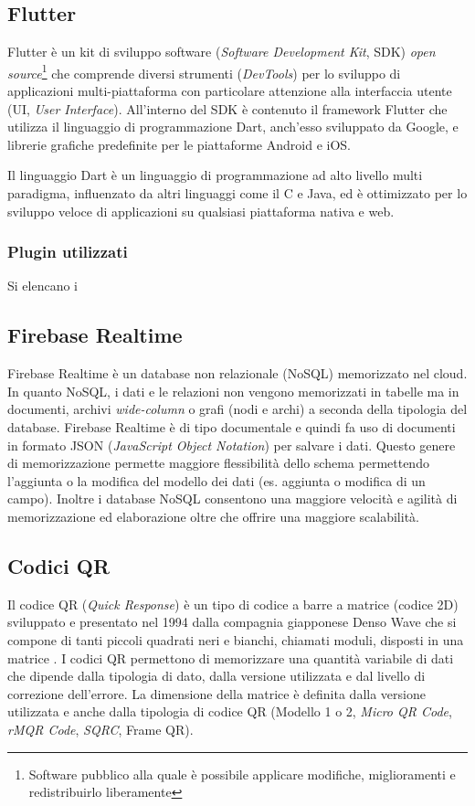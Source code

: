\subsection{Flutter}
Flutter \cite{flutter} è un kit di sviluppo software (\textit{Software Development Kit}, SDK) \textit{open source}\footnote{Software pubblico alla quale è possibile applicare modifiche, miglioramenti e redistribuirlo liberamente} che comprende diversi strumenti (\textit{DevTools}) per lo sviluppo di applicazioni multi-piattaforma con particolare attenzione alla interfaccia utente (UI, \textit{User Interface}). All'interno del SDK è contenuto il framework Flutter che utilizza il linguaggio di programmazione Dart, anch'esso sviluppato da Google, e librerie grafiche predefinite per le piattaforme Android e iOS.

Il linguaggio Dart è un linguaggio di programmazione ad alto livello multi paradigma, influenzato da altri linguaggi come il C e Java, ed è ottimizzato per lo sviluppo veloce di applicazioni su qualsiasi piattaforma nativa e web.

\subsubsection{Plugin utilizzati}
Si elencano i 
\subsection{Firebase Realtime}
Firebase Realtime \cite{firebase} è un database non relazionale (NoSQL) memorizzato nel cloud. In quanto NoSQL, i dati e le relazioni non vengono memorizzati in tabelle ma in documenti, archivi \textit{wide-column} o grafi (nodi e archi) a seconda della tipologia del database.
Firebase Realtime è di tipo documentale e quindi fa uso di documenti in formato JSON (\textit{JavaScript Object Notation}) per salvare i dati. Questo genere di memorizzazione permette maggiore flessibilità dello schema permettendo l'aggiunta o la modifica del modello dei dati (es. aggiunta o modifica di un campo). Inoltre i database NoSQL consentono una maggiore velocità e agilità di memorizzazione ed elaborazione oltre che offrire una maggiore scalabilità.
%
\subsection{Codici QR}
Il codice QR (\textit{Quick Response}) è un tipo di codice a barre a matrice (codice 2D) sviluppato e presentato nel 1994 dalla compagnia giapponese Denso Wave che si compone di tanti piccoli quadrati neri e bianchi, chiamati moduli, disposti in una matrice \cite{qrCodeDensoWave}.
I codici QR permettono di memorizzare una quantità variabile di dati che dipende dalla tipologia di dato, dalla versione utilizzata e dal livello di correzione dell'errore. La dimensione della matrice è definita dalla versione utilizzata e anche dalla tipologia di codice QR (Modello 1 o 2, \textit{Micro QR Code}, \textit{rMQR Code}, \textit{SQRC}, Frame QR).

